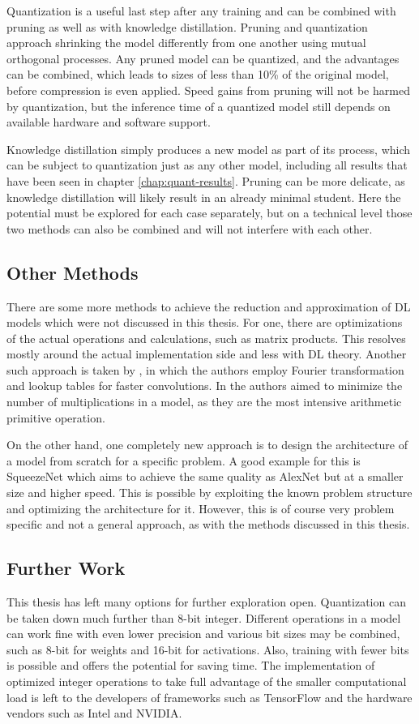 Quantization is a useful last step after any training and can be combined with pruning as well as with knowledge distillation. Pruning and quantization approach shrinking the model differently from one another using mutual orthogonal processes. Any pruned model can be quantized, and the advantages can be combined, which leads to sizes of less than 10\% of the original model, before compression is even applied. Speed gains from pruning will not be harmed by quantization, but the inference time of a quantized model still depends on available hardware and software support.

Knowledge distillation simply produces a new model as part of its process, which can be subject to quantization just as any other model, including all results that have been seen in chapter \ref{chap:quant-results}. Pruning can be more delicate, as knowledge distillation will likely result in an already minimal student. Here the potential must be explored for each case separately, but on a technical level those two methods can also be combined and will not interfere with each other.

\subsection{Other Methods}
There are some more methods to achieve the reduction and approximation of DL models which were not discussed in this thesis. For one, there are optimizations of the actual operations and calculations, such as matrix products. This resolves mostly around the actual implementation side and less with DL theory. Another such approach is taken by \cite{other:fft}, in which the authors employ Fourier transformation and lookup tables for faster convolutions. In \cite{other:few-multi} the authors aimed to minimize the number of multiplications in a model, as they are the most intensive arithmetic primitive operation.

On the other hand, one completely new approach is to design the architecture of a model from scratch for a specific problem. A good example for this is SqueezeNet \cite{ref:squeezenet} which aims to achieve the same quality as AlexNet but at a smaller size and higher speed. This is possible by exploiting the known problem structure and optimizing the architecture for it. However, this is of course very problem specific and not a general approach, as with the methods discussed in this thesis.

\subsection{Further Work}
This thesis has left many options for further exploration open. Quantization can be taken down much further than 8-bit integer. Different operations in a model can work fine with even lower precision and various bit sizes may be combined, such as 8-bit for weights and 16-bit for activations. Also, training with fewer bits is possible and offers the potential for saving time. The implementation of optimized integer operations to take full advantage of the smaller computational load is left to the developers of frameworks such as TensorFlow and the hardware vendors such as Intel and NVIDIA.

